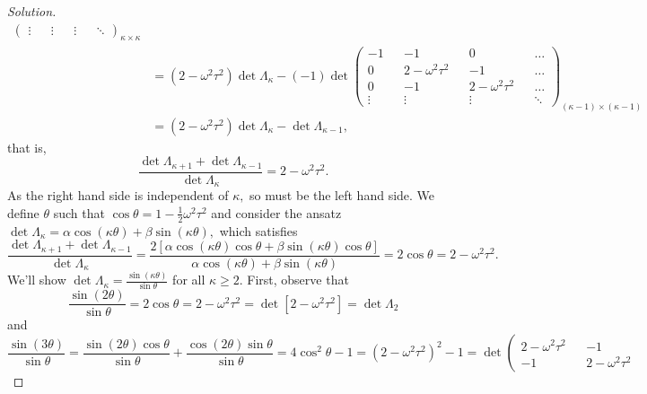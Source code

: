 \begin{proof}[Solution]
\begin{align*}
\begin{pmatrix}
         \vdots && \vdots && \vdots && \ddots
      \end{pmatrix}_{\kappa \times \kappa}\\
      &= (2 - \omega^2 \tau^2) \det \Lambda_\kappa - (-1) \det 
      \begin{pmatrix}
         -1 && -1 && 0 && \dots\\
         0 && 2 - \omega^2 \tau^2 && -1 && \dots\\
         0 && -1 && 2- \omega^2 \tau^2 && \dots\\
         \vdots && \vdots && \vdots && \ddots
      \end{pmatrix}_{(\kappa-1) \times (\kappa-1)}\\
      &= (2- \omega^2 \tau^2)\det \Lambda_\kappa - \det \Lambda_{\kappa -1},
   \end{align*}
   that is,
   \begin{equation*}
      \frac{\det{\Lambda_{\kappa+1}} + \det{\Lambda_{\kappa - 1}}}{\det{\Lambda_{\kappa}}} = 2 - \omega^2 \tau^2.
   \end{equation*}
   As the right hand side is independent of \(\kappa,\) so must be the left hand side. We define \(\theta\) such that \(\cos\theta = 1 - \frac12 \omega^2 \tau^2\) and consider the ansatz \(\det \Lambda_{\kappa} = \alpha \cos(\kappa \theta) + \beta \sin(\kappa \theta),\) which satisfies
   \begin{equation*}
      \frac{\det{\Lambda_{\kappa+1}} + \det{\Lambda_{\kappa - 1}}}{\det{\Lambda_{\kappa}}} = \frac{2\left[\alpha \cos(\kappa \theta) \cos\theta + \beta \sin(\kappa \theta) \cos \theta\right]}{\alpha \cos(\kappa \theta) + \beta \sin (\kappa \theta)} = 2 \cos\theta = 2 - \omega^2 \tau^2.
   \end{equation*}
   We'll show \(\det\Lambda_{\kappa} = \frac{\sin(\kappa \theta)}{\sin\theta}\) for all \(\kappa \geq 2.\) First, observe that
   \begin{equation*}
      \frac{\sin(2 \theta)}{\sin\theta} = 2\cos\theta = 2 - \omega^2 \tau^2 = \det[2 - \omega^2 \tau^2] = \det{\Lambda_{2}}
   \end{equation*}
   and
   \begin{equation*}
      \frac{\sin(3 \theta)}{\sin\theta} = \frac{\sin(2\theta) \cos\theta}{\sin\theta} + \frac{\cos(2\theta)\sin\theta}{\sin\theta} = 4\cos^2\theta - 1 = (2 - \omega^2 \tau^2)^2 - 1 = \det\left(\begin{smallmatrix}
            2 - \omega^2 \tau^2 && -1\\
            -1 && 2 - \omega^2\tau^2

\end{smallmatrix}
\end{equation*}
\end{proof}
